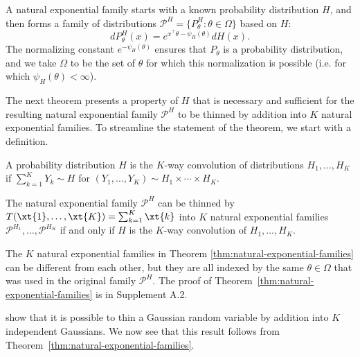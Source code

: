 \documentclass[12pt]{article}
\begin{document}
 
A natural exponential family \citep{lehmann2005testing} starts with a known probability distribution $H$, and then forms a family of distributions $\mathcal P^H=\{P^H_\theta:\theta\in\Omega\}$ based on $H$:
\begin{equation}
    dP^H_\theta(x)=e^{x^\top\theta-\psi_H(\theta)}dH(x).\label{eq:natural}
\end{equation}
The normalizing constant $e^{-\psi_H(\theta)}$ ensures that $P_\theta$ is a probability distribution, and we take $\Omega$ to be the set of $\theta$ for which this normalization is possible (i.e. for which $\psi_H(\theta)<\infty$).  

The next theorem presents a property of $H$ that is  necessary and sufficient for the resulting natural exponential family $\mathcal P^H$ to be thinned by addition into $K$ natural exponential families.  To streamline the statement of the theorem, we start with a definition.
 
\begin{definition}
\label{def:conv}
A probability distribution $H$ is the $K$-way convolution of distributions $H_1,\ldots, H_K$ if $\sum_{k=1}^KY_k\sim H$ for $(Y_1,\ldots,Y_K)\sim H_1\times\cdots\times H_K$.
\end{definition}

\begin{theorem}\label{thm:natural-exponential-families}
The natural exponential family $\mathcal P^H$ can be thinned by $T(\xt{1},\ldots,\xt{K})=\sum_{k=1}^K\xt{k}$ into $K$ natural exponential families $\mathcal P^{H_1},\ldots,\mathcal P^{H_K}$ if and only if $H$ is the $K$-way convolution of $H_1,\ldots,H_K$.
\end{theorem}

The $K$ natural exponential families in Theorem \ref{thm:natural-exponential-families} can be different from each other, but they are all indexed by the same $\theta\in\Omega$ that was used in the original family $\mathcal P^H$. The proof of Theorem~\ref{thm:natural-exponential-families} is in Supplement A.2. 

\cite{neufeld2023data} show that it is possible to thin a Gaussian random variable by addition into $K$ independent Gaussians.  We now see that this result follows from Theorem~\ref{thm:natural-exponential-families}. 
\end{document}
